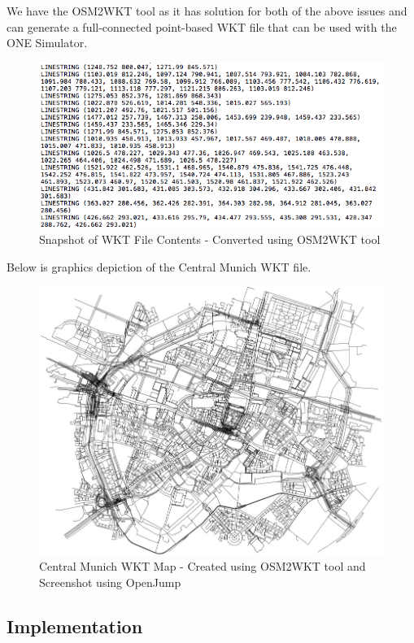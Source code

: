 	We have the OSM2WKT tool \cite{mayer2010osm} as it has solution for both of the above issues and can generate a full-connected point-based WKT file that can be used with the ONE Simulator.
	\newline
	\begin{figure}[h]
		\centering
		\includegraphics[scale=0.55]{./figures/wkt-file-1}
		\caption{Snapshot of WKT File Contents - Converted using OSM2WKT tool \cite{mayer2010osm} }
	\end{figure}
	\newpage
	Below is graphics depiction of the Central Munich WKT file.
	\begin{figure}[h]
		\centering
		\includegraphics[scale=0.5]{./figures/central-munich-wkt}
		\caption{Central Munich WKT Map - Created using OSM2WKT tool \cite{mayer2010osm} and Screenshot using OpenJump \cite{openjump}}
	\end{figure}

\newpage
\subsection{Implementation}
